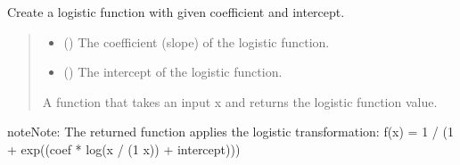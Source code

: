 \documentclass[letterpaper,10pt,english]{sphinxmanual}
\begin{document}
\begin{fulllineitems}
\label{\detokenize{calzone:calzone.metrics.logit_func}}
\pysigstartsignatures
{}
\pysigstopsignatures
\sphinxAtStartPar
Create a logistic function with given coefficient and intercept.
\begin{quote}\begin{description}
\begin{itemize}
\item {} 
\sphinxAtStartPar
{} () \textendash{} The coefficient (slope) of the logistic function.

\item {} 
\sphinxAtStartPar
{} () \textendash{} The intercept of the logistic function.

\end{itemize}

\sphinxAtStartPar
{} \textendash{} A function that takes an input x and returns the logistic function value.

\end{description}\end{quote}

\begin{sphinxadmonition}{note}{Note:}
\sphinxAtStartPar
The returned function applies the logistic transformation:
f(x) = 1 / (1 + exp(\sphinxhyphen{}(coef * log(x / (1 \sphinxhyphen{} x)) + intercept)))
\end{sphinxadmonition}

\end{fulllineitems}

\end{document}
